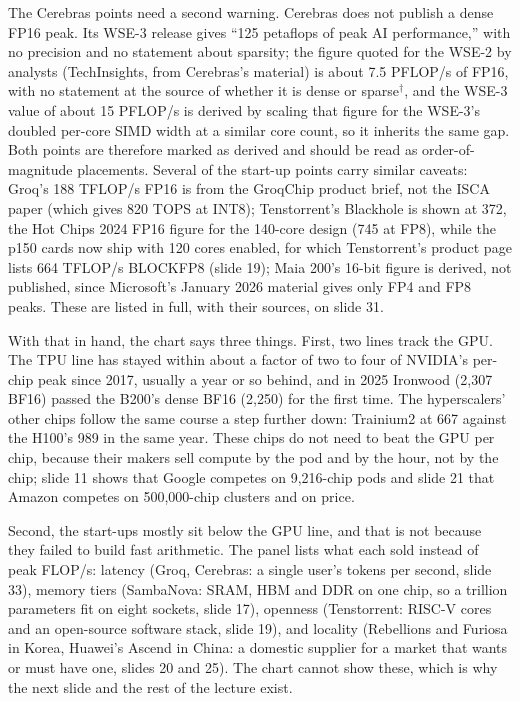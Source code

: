 \documentclass[11pt,letterpaper]{article}
\begin{document}
The Cerebras points need a second warning. Cerebras does not publish a dense FP16 peak. Its WSE-3 release gives ``125 petaflops of peak AI performance,'' with no precision and no statement about sparsity; the figure quoted for the WSE-2 by analysts (TechInsights, from Cerebras's material) is about 7.5 PFLOP/s of FP16, with no statement at the source of whether it is dense or sparse$^\dagger$, and the WSE-3 value of about 15 PFLOP/s is derived by scaling that figure for the WSE-3's doubled per-core SIMD width at a similar core count, so it inherits the same gap. Both points are therefore marked as derived and should be read as order-of-magnitude placements. Several of the start-up points carry similar caveats: Groq's 188 TFLOP/s FP16 is from the GroqChip product brief, not the ISCA paper (which gives 820 TOPS at INT8); Tenstorrent's Blackhole is shown at 372, the Hot Chips 2024 FP16 figure for the 140-core design (745 at FP8), while the p150 cards now ship with 120 cores enabled, for which Tenstorrent's product page lists 664 TFLOP/s BLOCKFP8 (slide 19); Maia 200's 16-bit figure is derived, not published, since Microsoft's January 2026 material gives only FP4 and FP8 peaks. These are listed in full, with their sources, on slide 31.

With that in hand, the chart says three things. First, two lines track the GPU. The TPU line has stayed within about a factor of two to four of NVIDIA's per-chip peak since 2017, usually a year or so behind, and in 2025 Ironwood (2{,}307 BF16) passed the B200's dense BF16 (2{,}250) for the first time. The hyperscalers' other chips follow the same course a step further down: Trainium2 at 667 against the H100's 989 in the same year. These chips do not need to beat the GPU per chip, because their makers sell compute by the pod and by the hour, not by the chip; slide 11 shows that Google competes on 9{,}216-chip pods and slide 21 that Amazon competes on 500{,}000-chip clusters and on price.

Second, the start-ups mostly sit below the GPU line, and that is not because they failed to build fast arithmetic. The panel lists what each sold instead of peak FLOP/s: latency (Groq, Cerebras: a single user's tokens per second, slide 33), memory tiers (SambaNova: SRAM, HBM and DDR on one chip, so a trillion parameters fit on eight sockets, slide 17), openness (Tenstorrent: RISC-V cores and an open-source software stack, slide 19), and locality (Rebellions and Furiosa in Korea, Huawei's Ascend in China: a domestic supplier for a market that wants or must have one, slides 20 and 25). The chart cannot show these, which is why the next slide and the rest of the lecture exist.
\end{document}
